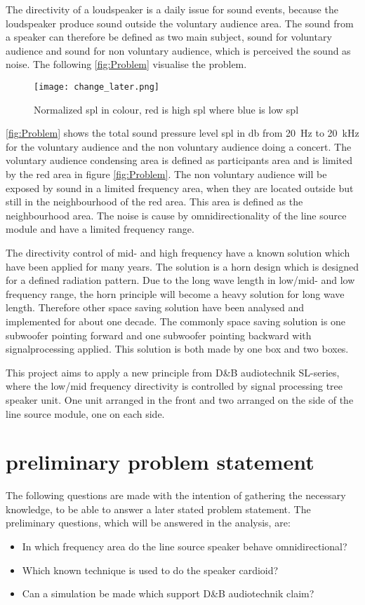 
The directivity of a loudspeaker is a daily issue for sound events, because the loudspeaker produce sound outside the voluntary audience area. The sound from a speaker can therefore be defined as two main subject, sound for voluntary audience and sound for non voluntary audience, which is perceived the sound as noise. The following \autoref{fig:Problem} visualise the problem.


\begin{figure}[htbp]
	\centering
	\texttt{[image: change\_later.png]}
	\caption{Normalized \gls{spl} in colour, red is high \gls{spl} where blue is low \gls{spl}}
		\label{fig:Problem}
\end{figure}

\autoref{fig:Problem} shows the total sound pressure level \gls{spl} in \gls{db} from \SI{20}{\hertz} to \SI{20}{\kilo\hertz} for the voluntary audience and the non voluntary audience doing a concert. The voluntary audience condensing area is defined as participants area and is limited by the red area in figure \autoref{fig:Problem}. The non voluntary audience will be exposed by sound in a limited frequency area, when they are located outside but still in the neighbourhood of the red area. This area is defined as the neighbourhood area. The noise is cause by omnidirectionality of the line source module and have a limited frequency range. 

The directivity control of mid- and high frequency have a known solution which have been applied for many years. The solution is a horn design which is designed for a defined radiation pattern. Due to the long wave length in low/mid- and low frequency range, the horn principle will become a heavy solution for long wave length. Therefore other space saving solution have been analysed and implemented for about one decade. The commonly space saving solution is one subwoofer pointing forward and one subwoofer pointing backward with signalprocessing applied. This solution is both made by one box and two boxes.


This project aims to apply a new principle from D\&B audiotechnik SL-series, where the low/mid frequency directivity is controlled by signal processing tree speaker unit. One unit arranged in the front and two arranged on the side of the line source module, one on each side.



\section{preliminary problem statement}
The following questions are made with the intention of gathering the necessary knowledge, to be able to answer a later stated problem statement. The preliminary questions, which will be answered in the analysis, are:

\begin{itemize}
\item In which frequency area do the line source speaker behave omnidirectional?
\item Which known technique is used to do the speaker cardioid?
\item Can a simulation be made which support D\&B audiotechnik claim?
\end{itemize}



